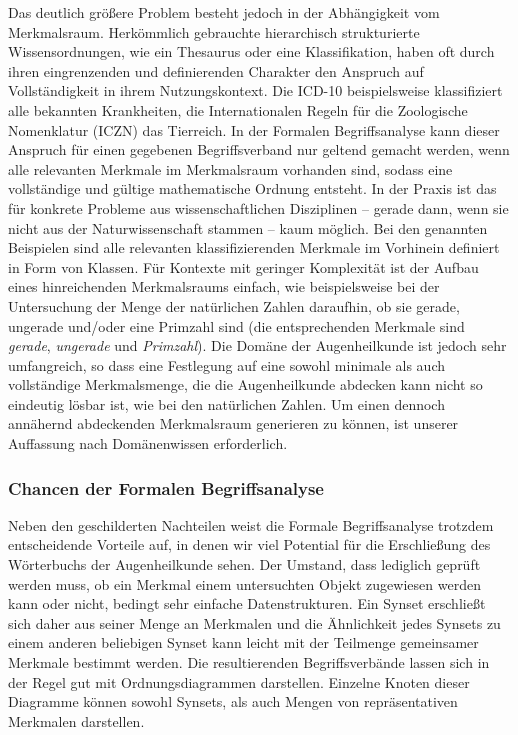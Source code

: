 \documentclass[pagesize,DIV=calc,12pt,final]{scrreprt}
\begin{document}
Das deutlich größere Problem besteht jedoch in der Abhängigkeit vom Merkmalsraum. 
Herkömmlich gebrauchte hierarchisch strukturierte Wissensordnungen, wie ein Thesaurus oder eine Klassifikation, haben oft durch ihren eingrenzenden und definierenden Charakter den Anspruch auf Vollständigkeit in ihrem Nutzungskontext. 
Die ICD-10 beispielsweise klassifiziert alle bekannten Krankheiten, die Internationalen Regeln für die Zoologische Nomenklatur (ICZN) das Tierreich. 
In der Formalen Begriffsanalyse kann dieser Anspruch für einen gegebenen Begriffsverband nur geltend gemacht werden, wenn alle relevanten Merkmale im Merkmalsraum vorhanden sind, sodass eine vollständige und gültige mathematische Ordnung entsteht. 
In der Praxis ist das für konkrete Probleme aus wissenschaftlichen Disziplinen -- gerade dann, wenn sie nicht aus der Naturwissenschaft stammen -- kaum möglich. 
Bei den genannten Beispielen sind alle relevanten klassifizierenden Merkmale im Vorhinein definiert in Form von Klassen. 
Für Kontexte mit geringer Komplexität ist der Aufbau eines hinreichenden Merkmalsraums einfach, wie beispielsweise bei der Untersuchung der Menge der natürlichen Zahlen daraufhin, ob sie gerade, ungerade und/oder eine Primzahl sind (die entsprechenden Merkmale sind \textit{gerade}, \textit{ungerade} und \textit{Primzahl}).
Die Domäne der Augenheilkunde ist jedoch sehr umfangreich, so dass eine Festlegung auf eine sowohl minimale als auch vollständige Merkmalsmenge, die die Augenheilkunde abdecken kann nicht so eindeutig lösbar ist, wie bei den natürlichen Zahlen. 
Um einen dennoch annähernd abdeckenden Merkmalsraum generieren zu können, ist unserer Auffassung nach Domänenwissen erforderlich. 

\subsubsection{Chancen der Formalen Begriffsanalyse}

Neben den geschilderten Nachteilen weist die Formale Begriffsanalyse trotzdem entscheidende Vorteile auf, in denen wir viel Potential für die Erschließung des Wörterbuchs der Augenheilkunde sehen. 
Der Umstand, dass lediglich geprüft werden muss, ob ein Merkmal einem untersuchten Objekt zugewiesen werden kann oder nicht, bedingt sehr einfache Datenstrukturen.
Ein Synset erschließt sich daher aus seiner Menge an Merkmalen und die Ähnlichkeit jedes Synsets zu einem anderen beliebigen Synset kann leicht mit der Teilmenge gemeinsamer Merkmale bestimmt werden.
Die resultierenden Begriffsverbände lassen sich in der Regel gut mit Ordnungsdiagrammen darstellen.
Einzelne Knoten dieser Diagramme können sowohl Synsets, als auch Mengen von repräsentativen Merkmalen darstellen. 
\end{document}
